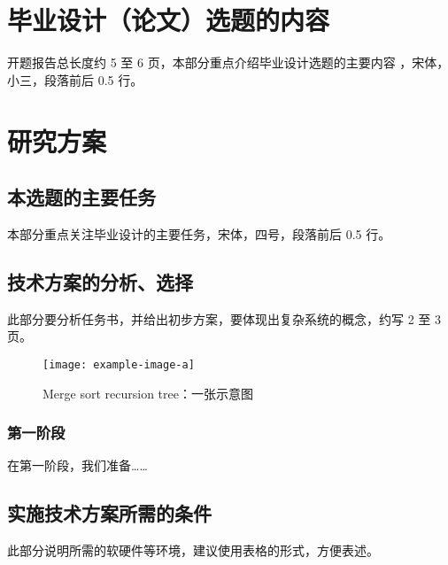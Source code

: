 \documentclass[proposal-report]{bitart}
\begin{document}


\pagestyle{fancy}
\setcounter{page}{1}


\setlength{\parskip}{0em}
\renewcommand{\baselinestretch}{1.53}
\setlength{\parindent}{1.02cm}

\section{毕业设计（论文）选题的内容}
开题报告总长度约 5 至 6 页，本部分重点介绍毕业设计选题的主要内容 \cite{LeCun2010}，宋体，小三，段落前后 0.5 行。

\section{研究方案}
\subsection{本选题的主要任务}
本部分重点关注毕业设计的主要任务，宋体，四号，段落前后 0.5 行。

\subsection{技术方案的分析、选择}
此部分要分析任务书，并给出初步方案，要体现出复杂系统的概念，约写 2 至 3 页。

\begin{figure}[!ht]
  \centering
  \texttt{[image: example-image-a]}
  \caption{Merge sort recursion tree：一张示意图}
  \label{fig:mergesort}
\end{figure}

\subsubsection{第一阶段}
在第一阶段，我们准备……

\subsection{实施技术方案所需的条件}
此部分说明所需的软硬件等环境，建议使用表格的形式，方便表述。
\end{document}
